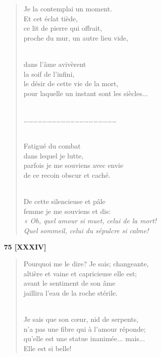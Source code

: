 \documentclass[a4paper,12pt]{book}
\begin{document}
\begin{verse}
Je la contemplai un moment. \\
Et cet éclat tiède, \\
ce lit de pierre qui offrait, \\
proche du mur, un autre lieu vide, \\ \

dans l'âme avivèrent \\
la soif de l'infini, \\
le désir de cette vie de la mort, \\
pour laquelle un instant sont les siècles... \\ \

\ldots\ldots\ldots\ldots\ldots\ldots\ldots\ldots\ldots\ldots\ldots\ldots\ldots\ldots\ldots\ldots\ldots\ldots\ldots\ldots \\ \

Fatigué du combat \\
dans lequel je lutte, \\
parfois je me souviens avec envie \\
de ce recoin obscur et caché. \\ \

De cette silencieuse et pâle \\
femme je me souviens et dis: \\
{\em « Oh, quel amour si muet, celui de la mort! \\
Quel sommeil, celui du sépulcre si calme!} \\
\end{verse}

\bigskip

\begin{center} {\bf 75 [XXXIV]} \end{center}

\begin{verse}
Pourquoi me le dire? Je sais; changeante, \\
altière et vaine et capricieuse elle est; \\
avant le sentiment de son âme \\
jaillira l'eau de la roche stérile. \\ \

Je sais que son c{\oe}ur, nid de serpents, \\
n'a pas une fibre qui à l'amour réponde; \\
qu'elle est une statue inanimée... mais... \\
Elle est si belle! \\
\end{verse}
\end{document}
